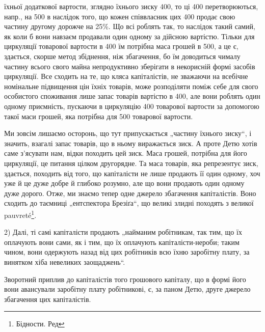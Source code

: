 \parcont{}  %
їхньої додаткової вартости, зглядно їхнього зиску \deq{} 400, то
ці 400 перетворюються, напр., на 500 в наслідок
того, що кожен співвласник цих 400 продає свою частину другому
дорожче на 25\%. Що всі роблять так, то наслідок такий самий,
як коли б вони навзаєм продавали один одному за дійсною вартістю.
Тільки для циркуляції товарової вартости в 400 їм потрібна
маса грошей в 500, а це є, здається, скорше метод збіднення,
ніж збагачення, бо їм доводиться чималу частину всього свого майна
непродуктивно зберігати в некорисній формі засобів циркуляції. Все
сходить на те, що кляса капіталістів, не зважаючи на всебічне номінальне
підвищення цін їхніх товарів, може розподіляти поміж себе для свого
особистого споживання лише запас товарів вартістю в 400, але вони роблять один одному приємність, пускаючи в циркуляцію
400 товарової вартости за допомогою такої маси грошей,
яка потрібна для 500 товарової вартости.

Ми зовсім лишаємо осторонь, що тут припускається „частину їхнього
зиску“, і значить, взагалі запас товарів, що в ньому виражається зиск.
А проте Детю хотів саме з’ясувати нам, відки походить цей зиск. Маса
грошей, потрібна для його циркуляції, це питання цілком другорядне. Та маса
товарів, яка репрезентує зиск, здається, походить від того, що капіталісти
не лише продають її один одному, хоч уже й це дуже добре й
глибоко розумно, але що вони продають один одному дуже дорого.
Отже, ми знаємо тепер одне джерело збагачення капіталістів. Воно сходить
до таємниці „ентспектора Брезіґа“, що великі злидні походять з великої
pauvreté\footnote*{
Бідности. Ред
}.

2) Далі, ті самі капіталісти продають „найманим робітникам, так тим,
що їх оплачують вони сами, як і тим, що їх оплачують капіталісти-нероби;
таким чином, вони одержують назад від цих робітників всю їхню заробітну
плату, за винятком хіба невеликих заощаджень“.

Зворотний приплив до капіталістів того грошового капіталу, що
в формі його вони авансували заробітну плату робітникові, є, за паном
Детю, друге джерело збагачення цих капіталістів.

